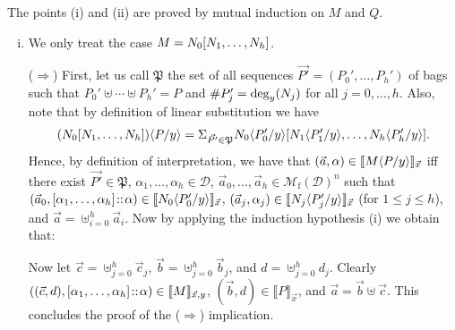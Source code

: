 \documentclass{LMCS}
\newcommand{\Int}[1]{\llbracket #1\rrbracket} \newcommand{\trm}[1]{#1^{\textrm{--}}}
\newcommand{\Mfin}[1]{\mathcal{M}_{\mathrm{f}}(#1)}
\newcommand{\mcup}{\uplus}
\newcommand{\seq}[1]{\vec{#1}}
\newcommand{\cD}{\mathcal{D}}
\begin{document}
\proof The points (i) and (ii) are proved by mutual induction on $M$ and $Q$.

\begin{enumerate}[(i)] 
\item We only treat the case $M = N_0[N_1,\ldots,N_h]$.

($\Rightarrow$) 
First, let us call $\mathfrak{P}$ the set of all sequences $\seq {P'} = (P_0',\ldots,P_h')$ of bags such that $P_0' \mcup \cdots \mcup P_h' = P$ and $\# P_j' = \mathrm{deg}_{y}(N_j)$ for all $j=0,\ldots,h$. 
Also, note that by definition of linear substitution we have 
\[(N_0[N_1,\ldots,N_h])\lsubst{y}{P} = \Sigma_{\seq {P'} \in
  \mathfrak{P}}
N_0\lsubst{y}{P_0'}[N_1\lsubst{y}{P_1'},\ldots,N_h\lsubst{y}{P_h'}].
\]
 Hence, by definition of interpretation, we have that $(\seq a, \alpha)\in \Int{M\lsubst{y}{P}}_{\seq x}$ iff there exist $\seq {P'} \in \mathfrak{P}$, $\alpha_1,\ldots,\alpha_h \in \cD$, $\seq a_0,\ldots,\seq a_h \in \Mfin{\cD}^n$ such that $(\seq a_0,[\alpha_1,\ldots,\alpha_h] \at \alpha)\in \Int{N_0\lsubst{y}{P_0'}}_{\seq x}$, $(\seq a_j,\alpha_j) \in \Int{N_j\lsubst{y}{P_j'}}_{\seq x}$ (for $1\le j\le h$), and $\seq{a} = \mcup_{i=0}^h \seq a_i$. Now by applying the induction hypothesis (i) we obtain that:

\noindent Now let $\seq {c} = \mcup_{j=0}^{h}\seq c_j$, $\seq {b} =
\mcup_{j=0}^{h}\seq b_j$, and $d = \mcup_{j=0}^{h} d_j$. Clearly
$((\seq {c},d),[\alpha_1,\ldots,\alpha_h] \at
\alpha)\in\Int{M}_{\seq x,y}$, $(\seq {b},d) \in \Int{P}_{\seq x}$,
and $\seq a = \seq {b} \mcup \seq {c}$. This concludes the proof of
the ($\Rightarrow$) implication.


\end{enumerate}
\end{document}
